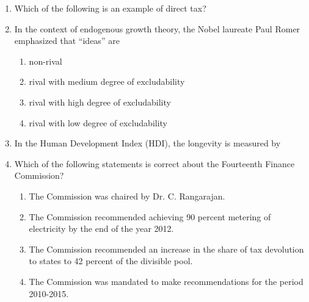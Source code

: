 \documentclass[12pt]{article}
\theoremstyle{remark}
\begin{document}
\begin{enumerate}
\item Which of the following is an example of direct tax? 
\begin{enumerate}  \end{enumerate}
\hfill{}
\item In the context of endogenous growth theory, the Nobel laureate Paul Romer emphasized that “ideas” are 
\begin{enumerate} 
\item  non-rival 
\item  rival with medium degree of excludability
\item  rival with high degree of excludability
\item  rival with low degree of excludability 
\end{enumerate}
\hfill{}
\item  In the Human Development Index (HDI), the longevity is measured by 
\begin{enumerate}  \end{enumerate}
\hfill{}
\item  Which of the following statements is correct about the Fourteenth Finance Commission? 
\begin{enumerate} 
\item  The Commission was chaired by Dr. C. Rangarajan. 
\item  The Commission recommended achieving 90 percent metering of electricity by the end of the year 2012. 
\item  The Commission recommended an increase in the share of tax devolution to states to 42 percent of the divisible pool. 
\item  The Commission was mandated to make recommendations for the period 2010-2015. 

\end{enumerate}
\end{enumerate}
\end{document}
